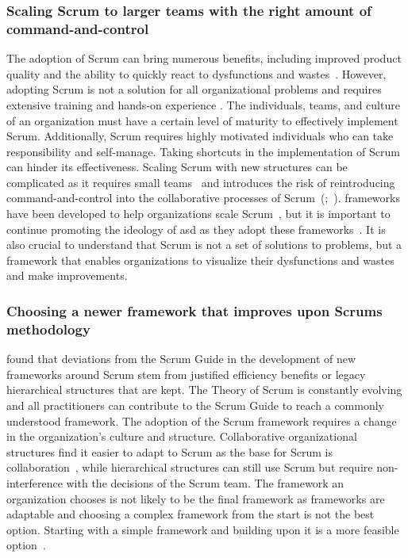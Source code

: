 \subsubsection*{Scaling Scrum to larger teams with the right amount of command-and-control}\label{subsubsec:ScalingScrumWithMoreControl}
The \gls{adoption} of Scrum can bring numerous benefits, including improved product quality and the ability to quickly react to dysfunctions and wastes~\cite[p.~10]{Rubin2012ESA}. However, adopting Scrum is not a solution for all organizational problems and requires extensive training and hands-on experience \cite[p.~1]{Radhakrishnan2020TSw}. The individuals, teams, and culture of an organization must have a certain level of maturity to effectively implement Scrum. Additionally, Scrum requires highly motivated individuals who can take responsibility and self-manage. Taking shortcuts in the implementation of Scrum can hinder its effectiveness. Scaling Scrum with new structures can be complicated as it requires small teams~\cite[p.~1]{Akif2012Iac} and introduces the risk of reintroducing command-and-control into the collaborative processes of Scrum~(;~). \Glspl{framework} have been developed to help organizations scale Scrum~\cite[p.~50]{Moreira2013AtA}, but it is important to continue promoting the \gls{ideology} of \ac{asd} as they adopt these \glspl{framework}~\cite[p.~160]{Moreira2013AtA}. It is also crucial to understand that Scrum is not a set of solutions to problems, but a \gls{framework} that enables organizations to visualize their dysfunctions and wastes and make improvements.

\subsubsection*{Choosing a newer framework that improves upon Scrums methodology}\label{subsubsec:ChoosingAFramework}
 found that deviations from the Scrum Guide in the development of new \glspl{framework} around Scrum stem from justified efficiency benefits or legacy hierarchical structures that are kept. The Theory of Scrum is constantly evolving and all practitioners can contribute to the Scrum Guide to reach a commonly understood \gls{framework}. The \gls{adoption} of the Scrum \gls{framework} requires a change in the organization's culture and structure. Collaborative organizational structures find it easier to adapt to Scrum as the base for Scrum is collaboration~\cite[pp.~844--845]{Dybaa2008Eso}, while hierarchical structures can still use Scrum but require non-interference with the decisions of the Scrum team. The \gls{framework} an organization chooses is not likely to be the final \gls{framework} as \glspl{framework} are adaptable and choosing a complex \gls{framework} from the start is not the best option. Starting with a simple \gls{framework} and building upon it is a more feasible option~\cite[p.~123]{Maximini2018ISi}. 

